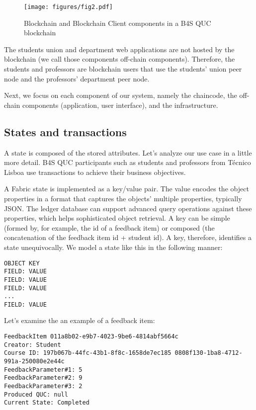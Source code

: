 \documentclass[12pt,a4paper]{article}
\theoremstyle{definition}
\begin{document}
    \begin{figure}[h]
        \centering
        \texttt{[image: figures/fig2.pdf]}
        \caption{Blockchain and Blockchain Client components in a B4S QUC blockchain}
        \label{fig:actors_detailed}
    \end{figure}

    The students union and department web applications are not hosted by the blockchain (we call those components off-chain components). Therefore, the students and professors are blockchain users that use the students' union peer node and the professors' department peer node.

    Next, we focus on each component of our system, namely the chaincode, the off-chain components (application, user interface), and the infrastructure.

    \subsection{States and transactions}
    A state is composed of the stored attributes. Let’s analyze our use case in a little more detail. B4S QUC participants such as students and professors from Técnico Lisboa use transactions to achieve their business objectives.

    A Fabric state is implemented as a key/value pair. The value encodes the object properties in a format that captures the objects' multiple properties, typically JSON. The ledger database can support advanced query operations against these properties, which helps sophisticated object retrieval. A key can be simple (formed by, for example, the id of a feedback item) or composed (the concatenation of the feedback item id + student id). A key, therefore, identifies a state unequivocally.  We model a state like this in the following manner:
    \begin{verbatim}
OBJECT KEY
FIELD: VALUE
FIELD: VALUE
FIELD: VALUE
...
FIELD: VALUE
    \end{verbatim}

    Let’s examine the an example of a feedback item:

    \begin{verbatim}
FeedbackItem 011a8b02-e9b7-4023-9be6-4814abf5664c
Creator: Student
Course ID: 197b067b-44fc-43b1-8f8c-1658de7ec185 0808f130-1ba8-4712-991a-250080e2e44c
FeedbackParameter#1: 5
FeedbackParameter#2: 9
FeedbackParameter#3: 2
Produced QUC: null
Current State: Completed
    \end{verbatim}
\end{document}
